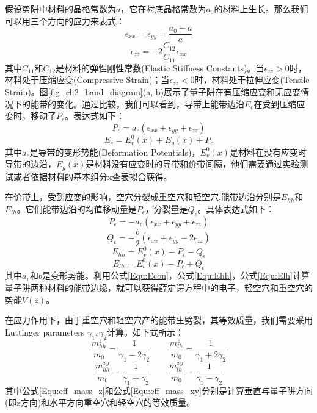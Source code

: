 假设势阱中材料的晶格常数为$a$，它在衬底晶格常数为$a_{0}$的材料上生长。那么我们可以用三个方向的应力来表式：
\begin{equation}
\label{Equ:exx}
\epsilon_{xx} = \epsilon_{yy} = \frac{a_{0}-a}{a}
\end{equation}
\begin{equation}
\label{Equ:ezz}
\epsilon_{zz} = -2\frac{C_{12}}{C_{11}}\epsilon_{xx}
\end{equation}
其中$C_{11}$和$C_{12}$是材料的弹性刚性常数(Elastic Stiffness Constants)。当$\epsilon_{zz}>0$时，材料处于压缩应变(Compressive Strain)；当$\epsilon_{zz}<0$时，材料处于拉伸应变(Tensile Strain)。图\ref{fig_ch2_band_diagram}(a, b)展示了量子阱在有压缩应变和无应变情况下的能带的变化。通过比较，我们可以看到，导带上能带边沿$E_c$在受到压缩应变时，移动了$P_{c}$。表达式如下：
\begin{equation}
\label{Equ:Pc}
P_{c} = a_{c}(\epsilon_{xx}+\epsilon_{yy}+\epsilon_{zz})
\end{equation}
\begin{equation}
\label{Equ:Econ}
E_{c} = E_{v}^{0}(x)+E_{g}(x)+P_{c}
\end{equation}
其中$a_{c}$是导带的变形势能(Deformation Potentials)，$E_v^0(x)$是材料在没有应变时导带的边沿，$E_{g}(x)$是材料没有应变时的导带和价带间隔，他们需要通过实验测试或者依据材料的基本组分x查表拟合获得\cite{chuang1995physics,li2000material}。

在价带上，受到应变的影响，空穴分裂成重空穴和轻空穴,能带边沿分别是$E_{hh}$和$E_{lh}$。它们能带边沿的均值移动量是$P_{\epsilon}$，分裂量是$Q_{\epsilon}$。具体表达式如下：
\begin{equation}
\label{Equ:Pe}
P_{\epsilon} = -a_{v}(\epsilon_{xx}+\epsilon_{yy}+\epsilon_{zz})
\end{equation}
\begin{equation}
\label{Equ:Qe}
Q_{\epsilon} = -\frac{b}{2}(\epsilon_{xx}+\epsilon_{yy}-2\epsilon_{zz})
\end{equation}
\begin{equation}
\label{Equ:Ehh}
E_{hh} = E_{v}^{0}(x)-P_{\epsilon}-Q_{\epsilon}
\end{equation}
\begin{equation}
\label{Equ:Elh}
E_{lh} = E_{v}^{0}(x)-P_{\epsilon}+Q_{\epsilon}
\end{equation}
其中$a_{v}$和$b$是变形势能。利用公式\ref{Equ:Econ}，公式\ref{Equ:Ehh}，公式\ref{Equ:Elh}计算量子阱两种材料的能带边缘，就可以获得薛定谔方程中的电子，轻空穴和重空穴的势能$V(z)$。

在应力作用下，由于重空穴和轻空穴产的能带生劈裂，其等效质量，我们需要采用Luttinger parameters $\gamma_1, \gamma_2$计算。如下式所示：
\begin{equation}
\label{Equ:eff_mass_z}
\frac{m_{hh}^z}{m_0}=\frac{1}{\gamma_1-2\gamma_2}~~~~~~~~~~\frac{m_{lh}^z}{m_0}=\frac{1}{\gamma_1+2\gamma_2}
\end{equation}
\begin{equation}
\label{Equ:eff_mass_xy}
\frac{m_{hh}^{xy}}{m_0}=\frac{1}{\gamma_1+\gamma_2}~~~~~~~~~~\frac{m_{lh}^{xy}}{m_0}=\frac{1}{\gamma_1-\gamma_2}
\end{equation}
其中公式\ref{Equ:eff_mass_z}和公式\ref{Equ:eff_mass_xy}分别是计算垂直与量子阱方向(即z方向)和水平方向重空穴和轻空穴的等效质量\cite{eppenga1987new}。

